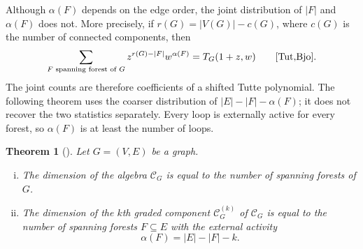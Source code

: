 \documentclass[reqno]{article}
\theoremstyle{plain} %
\newtheorem{theorem}{Theorem}[section]
\theoremstyle{definition}
\theoremstyle{remark}
\newcommand {\CC}{\mathscr{C}}
\numberwithin{equation}{section}
\begin{document}
Although $\alpha(F)$ depends on the edge order, the joint distribution
of $|F|$ and $\alpha(F)$ does not. More precisely, if
$r(G)=|V(G)|-c(G)$, where $c(G)$ is the number of connected components,
then
\[
 \sum_{F\text{ spanning forest of }G}
 z^{r(G)-|F|}w^{\alpha(F)}=T_G(1+z,w)
 \qquad\cite{Tut,Bjo}.
\]
The joint counts are therefore coefficients of a shifted Tutte polynomial.
The following theorem uses the coarser distribution of
$|E|-|F|-\alpha(F)$; it does not recover the two statistics separately.
Every loop is externally active for every forest, so $\alpha(F)$ is at
least the number of loops.


\begin{theorem}[\cite {PSS,Wa1}]
\label{th:forests}
Let $G=(V,E)$ be a graph.
\begin{enumerate}[(i)]
\item  The dimension of the algebra $\CC_G$ is equal to the number of spanning forests of $G$.

\item
  The dimension of the $k$th graded component $\CC_G^{(k)}$ of $\CC_G$ is
equal to the number of spanning forests $F\subseteq E$ with the external activity
 \[\alpha(F)=|E|-|F|-k. \]
\end{enumerate}
\end{theorem}
\end{document}
